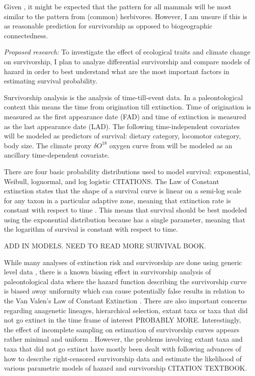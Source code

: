 \documentclass[12pt,letterpaper]{article}
\begin{document}
Given \citep{Jernvall2002}, it might be expected that the pattern for all mammals will be most similar to the pattern from (common) herbivores. However, I am unsure if this is as reasonable prediction for survivorship as opposed to biogeographic connectedness.



\textit{Proposed research:}
To investigate the effect of ecological traits and climate change on survivorship, I plan to analyze differential survivorship and compare models of hazard in order to best understand what are the most important factors in estimating survival probability.

Survivorship analysis is the analysis of time-till-event data. In a paleontological context this means the time from origination till extinction. Time of origination is measured as the first appearance date (FAD) and time of extinction is measured as the last appearance date (LAD). The following time-independent covariates will be modeled as predictors of survival: dietary category, locomotor category, body size. The climate proxy \(\delta O^{18}\) oxygen curve from \citet{Zachos2008} will be modeled as an ancillary time-dependent covariate.

There are four basic probability distributions used to model survival: exponential, Weibull, lognormal, and log logistic CITATIONS. The Law of Constant extinction states that the shape of a survival curve is linear on a semi-log scale for any taxon in a particular adaptive zone, meaning that extinction rate is constant with respect to time \citep{VanValen1973}. This means that survival should be best modeled using the exponential distribution because has a single parameter, meaning that the logarithm of survival is constant with respect to time.

ADD IN MODELS. NEED TO READ MORE SURVIVAL BOOK.

While many analyses of extinction risk and survivorship are done using generic level data \citep{Tomiya2013,Liow2008,Harnik2013}, there is a known biasing effect in survivorship analysis of paleontological data where the hazard function describing the survivorship curve is biased away uniformity \citep{Raup1975,Sepkoski1975} which can cause potentially false results in relation to the Van Valen's Law of Constant Extinction \citep{VanValen1973}. There are also important concerns regarding anagenetic lineages, hierarchical selection, extant taxa or taxa that did not go extinct in the time frame of interest \citep{Raup1975,VanValen1979,Simpson2006,Raup1991a} PROBABLY MORE. Interestingly, the effect of incomplete sampling on estimation of survivorship curves appears rather minimal and uniform \citep{Sepkoski1975}. However, the problems involving extant taxa and taxa that did not go extinct have mostly been dealt with following advances of how to describe right-censored survivorship data and estimate the likelihood of various parametric models of hazard and survivorship CITATION TEXTBOOK. 
\end{document}
